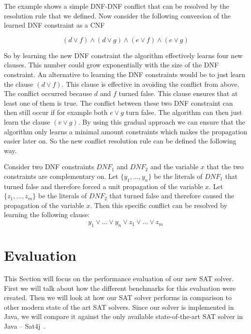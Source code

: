 \documentclass{easychair}
\begin{document}
The example shows a simple DNF-DNF conflict that can be resolved by the resolution rule that we defined. Now consider the following conversion of the learned DNF constraint as a CNF

\begin{displaymath}
(d \vee f) \wedge (d \vee g) \wedge (e \vee f) \wedge (e \vee g)
\end{displaymath}

So by learning the new DNF constraint the algorithm effectively learns four new clauses. This number could grow exponentially with the size of the DNF constraint. An alternative to learning the DNF constraints would be to just learn the clause $(d \vee f)$. This clause is effective in avoiding the conflict from above. The conflict occurred because $d$ and $f$ turned false. This clause ensures that at least one of them is true. The conflict between these two DNF constraint can then still occur if for example both $e \vee g$ turn false. The algorithm can then just learn the clause $(e \vee g)$. By using this gradual approach we can ensure that the algorithm only learns a minimal amount constraints which makes the propagation easier later on. So the new conflict resolution rule can be defined the following way.

Consider two DNF constraints $DNF_1$ and $DNF_2$ and the variable $x$ that the two constraints are complementary on. Let $\{y_1,...,y_n\}$ be the literals of $DNF_1$ that turned false and therefore forced a unit propagation of the variable $x$. Let $\{z_1,...,z_m\}$ be the literals of $DNF_2$ that turned false and therefore caused the propagation of the variable $x$. Then this specific conflict can be resolved by learning the following clause:
\begin{displaymath}
y_1 \vee ... \vee y_n \vee z_1 \vee ... \vee z_m
\end{displaymath}










\section{Evaluation}
\label{ch:Evaluation}

This Section will focus on the performance evaluation of our new SAT solver. First we will talk about how the different benchmarks for this evaluation were created. Then we will look at how our SAT solver performs in comparison to other modern state of the art SAT solvers. Since our solver is implemented in Java, we will compare it against the only available state-of-the-art SAT solver in Java -- Sat4j~\cite{le2010sat4j}.
\end{document}
